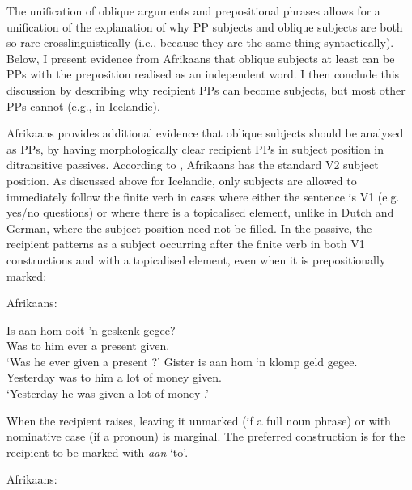 The unification of oblique arguments and prepositional phrases allows for a unification of the explanation of why PP subjects and oblique subjects are both so rare crosslinguistically (i.e., because they are the same thing syntactically). Below, I present evidence from Afrikaans that oblique subjects at least can be PPs with the preposition realised as an independent word. I then conclude this discussion by describing why recipient PPs can become subjects, but most other PPs cannot (e.g., in Icelandic).

Afrikaans provides additional evidence that oblique subjects should be analysed as PPs, by having morphologically clear recipient PPs in subject position in ditransitive passives. According to \cite{Stadler.1996}, Afrikaans has the standard V2 subject position. As discussed above for Icelandic, only subjects are allowed to immediately follow the finite verb in cases where either the sentence is V1 (e.g. yes/no questions) or where there is a topicalised element, unlike in Dutch and German, where the subject position need not be filled. In the passive, the recipient patterns as a subject occurring after the finite verb in both V1 constructions and with a topicalised element, even when it is prepositionally marked:
\begin{exe}
	\ex Afrikaans: \label{ex:af-rec-pass1}
\begin{xlist}
\ex \gll Is aan hom ooit 'n geskenk gegee?\\
Was to him ever a present given.\\
\trans `Was he ever given a present \citep[ex. 49]{Stadler.1996}?'
\ex \gll Gister is aan hom `n klomp geld gegee.\\
Yesterday was to him a {lot of} money given.\\
\trans `Yesterday he was given a lot of money \citep[ex. 50]{Stadler.1996}.'
\end{xlist}
\end{exe}

When the recipient raises, leaving it unmarked (if a full noun phrase) or with nominative case (if a pronoun) is marginal. The preferred construction is for the recipient to be marked with \emph{aan} `to'.

\begin{exe}
	\ex Afrikaans: \label{ex:af-rec-pass2}
\begin{xlist}
\end{xlist}
\end{exe}

